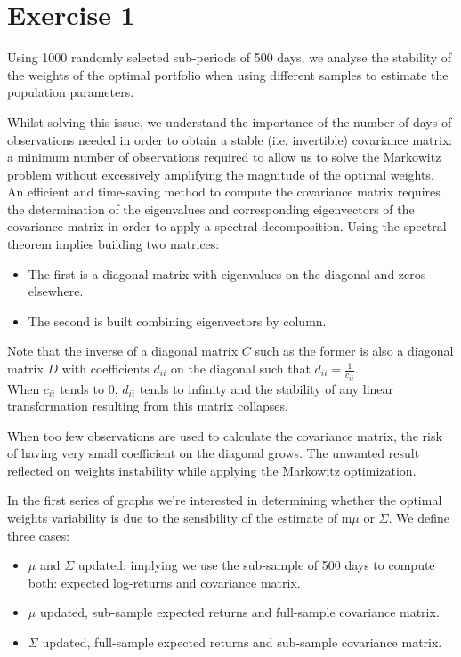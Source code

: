 
\chapter{Exercise 1}

Using 1000 randomly selected sub-periods of 500 days, we analyse the stability of the weights of the optimal portfolio when using different samples to estimate the population parameters.\par \smallskip

Whilst solving this issue, we understand the importance of the number of days of observations needed in order to obtain a stable (i.e. invertible) covariance matrix: a minimum number of observations required to allow us to solve the Markowitz problem without excessively amplifying the magnitude of the optimal weights. \\
An efficient and time-saving method to compute the covariance matrix requires the determination of the eigenvalues and corresponding eigenvectors of the covariance matrix in order to apply a spectral decomposition. Using the spectral theorem implies building two matrices:

\begin{itemize}
    \item The first is a diagonal matrix with eigenvalues on the diagonal and zeros elsewhere.
    \item The second is built combining eigenvectors by column.
\end{itemize}
Note that the inverse of a diagonal matrix $ C $ such as the former is also a diagonal matrix $ D $ with coefficients $ d_{ii} $ on the diagonal such that \(d_{ii}=\frac{1}{c_{ii}}\). \\
When $ c_{ii} $ tends to $ 0 $, $ d_{ii} $ tends to infinity and the stability of any linear transformation resulting from this matrix collapses.
\par\smallskip

When too few observations are used to calculate the covariance matrix, the risk of having very small coefficient on the diagonal grows. The unwanted result reflected on weights instability while applying the Markowitz optimization.
\par\smallskip
In the first series of graphs we’re interested in determining whether the optimal weights variability is due to the sensibility of the estimate of m$\mu$ or $\Sigma$. We define three cases:

\begin{itemize}
\item $\mu$ and $\Sigma$ updated: implying we use the sub-sample of 500 days to compute both: expected log-returns and covariance matrix.
\item $\mu$ updated, sub-sample expected returns and full-sample covariance matrix.
\item $\Sigma$ updated, full-sample expected returns and sub-sample covariance matrix.
\end{itemize}


